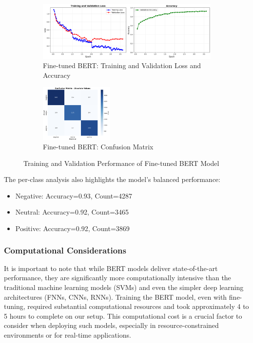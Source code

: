 \begin{figure}[h!]
\centering
\begin{subfigure}[t]{0.48\textwidth}
\centering
\includegraphics[width=\textwidth]{./images/bert.png}
\caption{Fine-tuned BERT: Training and Validation Loss and Accuracy}
\label{fig:bert_loss}
\end{subfigure}
\hfill
\begin{subfigure}[t]{0.48\textwidth}
\centering
\includegraphics[width=0.4\textwidth]{./images/bert-cm.png}
\caption{Fine-tuned BERT: Confusion Matrix}
\label{fig:bert_accuracy}
\end{subfigure}
\caption{Training and Validation Performance of Fine-tuned BERT Model}
\label{fig:bert_performance}
\end{figure}

The per-class analysis also highlights the model's balanced performance:
\begin{itemize}
\item Negative: Accuracy=0.93, Count=4287
\item Neutral: Accuracy=0.92, Count=3465
\item Positive: Accuracy=0.92, Count=3869
\end{itemize}

\subsubsection{\textbf{Computational Considerations}}

It is important to note that while BERT models deliver state-of-the-art performance, they are significantly more computationally intensive than the traditional machine learning models (SVMs) and even the simpler deep learning architectures (FNNs, CNNs, RNNs). Training the BERT model, even with fine-tuning, required substantial computational resources and took approximately 4 to 5 hours to complete on our setup. This computational cost is a crucial factor to consider when deploying such models, especially in resource-constrained environments or for real-time applications.

